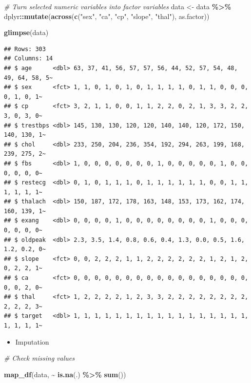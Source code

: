 \documentclass[
]{book}
\newenvironment{Shaded}{\begin{snugshade}}{\end{snugshade}}
\newcommand{\CommentTok}[1]{\textcolor[rgb]{0.56,0.35,0.01}{\textit{#1}}}
\newcommand{\FunctionTok}[1]{\textcolor[rgb]{0.13,0.29,0.53}{\textbf{#1}}}
\newcommand{\NormalTok}[1]{#1}
\newcommand{\OtherTok}[1]{\textcolor[rgb]{0.56,0.35,0.01}{#1}}
\newcommand{\SpecialCharTok}[1]{\textcolor[rgb]{0.81,0.36,0.00}{\textbf{#1}}}
\newcommand{\StringTok}[1]{\textcolor[rgb]{0.31,0.60,0.02}{#1}}
\providecommand{\tightlist}{%
  \setlength{\itemsep}{0pt}\setlength{\parskip}{0pt}}
\begin{document}
\begin{Shaded}
\begin{Highlighting}[]
\CommentTok{\# Turn selected numeric variables into factor variables}
\NormalTok{data }\OtherTok{\textless{}{-}}\NormalTok{ data }\SpecialCharTok{\%\textgreater{}\%}
\NormalTok{  dplyr}\SpecialCharTok{::}\FunctionTok{mutate}\NormalTok{(}\FunctionTok{across}\NormalTok{(}\FunctionTok{c}\NormalTok{(}\StringTok{"sex"}\NormalTok{, }\StringTok{"ca"}\NormalTok{, }\StringTok{"cp"}\NormalTok{, }\StringTok{"slope"}\NormalTok{, }\StringTok{"thal"}\NormalTok{), as.factor))}

\FunctionTok{glimpse}\NormalTok{(data)}
\end{Highlighting}
\end{Shaded}

\begin{verbatim}
## Rows: 303
## Columns: 14
## $ age      <dbl> 63, 37, 41, 56, 57, 57, 56, 44, 52, 57, 54, 48, 49, 64, 58, 5~
## $ sex      <fct> 1, 1, 0, 1, 0, 1, 0, 1, 1, 1, 1, 0, 1, 1, 0, 0, 0, 0, 1, 0, 1~
## $ cp       <fct> 3, 2, 1, 1, 0, 0, 1, 1, 2, 2, 0, 2, 1, 3, 3, 2, 2, 3, 0, 3, 0~
## $ trestbps <dbl> 145, 130, 130, 120, 120, 140, 140, 120, 172, 150, 140, 130, 1~
## $ chol     <dbl> 233, 250, 204, 236, 354, 192, 294, 263, 199, 168, 239, 275, 2~
## $ fbs      <dbl> 1, 0, 0, 0, 0, 0, 0, 0, 1, 0, 0, 0, 0, 0, 1, 0, 0, 0, 0, 0, 0~
## $ restecg  <dbl> 0, 1, 0, 1, 1, 1, 0, 1, 1, 1, 1, 1, 1, 0, 0, 1, 1, 1, 1, 1, 1~
## $ thalach  <dbl> 150, 187, 172, 178, 163, 148, 153, 173, 162, 174, 160, 139, 1~
## $ exang    <dbl> 0, 0, 0, 0, 1, 0, 0, 0, 0, 0, 0, 0, 0, 1, 0, 0, 0, 0, 0, 0, 0~
## $ oldpeak  <dbl> 2.3, 3.5, 1.4, 0.8, 0.6, 0.4, 1.3, 0.0, 0.5, 1.6, 1.2, 0.2, 0~
## $ slope    <fct> 0, 0, 2, 2, 2, 1, 1, 2, 2, 2, 2, 2, 2, 1, 2, 1, 2, 0, 2, 2, 1~
## $ ca       <fct> 0, 0, 0, 0, 0, 0, 0, 0, 0, 0, 0, 0, 0, 0, 0, 0, 0, 0, 0, 2, 0~
## $ thal     <fct> 1, 2, 2, 2, 2, 1, 2, 3, 3, 2, 2, 2, 2, 2, 2, 2, 2, 2, 2, 2, 3~
## $ target   <dbl> 1, 1, 1, 1, 1, 1, 1, 1, 1, 1, 1, 1, 1, 1, 1, 1, 1, 1, 1, 1, 1~
\end{verbatim}

\begin{itemize}
\tightlist
\item
  Imputation
\end{itemize}

\begin{Shaded}
\begin{Highlighting}[]
\CommentTok{\# Check missing values}

\FunctionTok{map\_df}\NormalTok{(data, }\SpecialCharTok{\textasciitilde{}} \FunctionTok{is.na}\NormalTok{(.) }\SpecialCharTok{\%\textgreater{}\%} \FunctionTok{sum}\NormalTok{())}
\end{Highlighting}
\end{Shaded}
\end{document}
